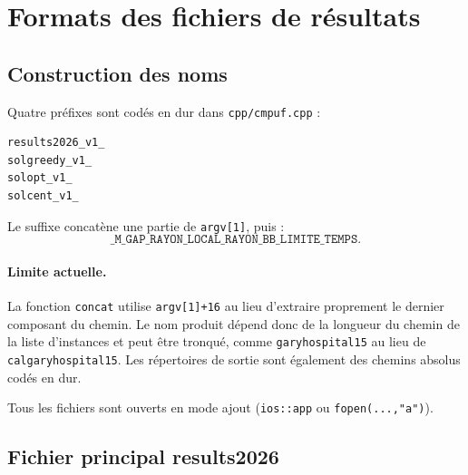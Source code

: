 \documentclass[11pt,a4paper]{article}
\newcommand{\code}[1]{\texttt{#1}}
\begin{document}
\section{Formats des fichiers de résultats}

\subsection{Construction des noms}

Quatre préfixes sont codés en dur dans \code{cpp/cmpuf.cpp} :
\begin{lstlisting}
results2026_v1_
solgreedy_v1_
solopt_v1_
solcent_v1_
\end{lstlisting}

Le suffixe concatène une partie de \code{argv[1]}, puis :
\[
\code{\_M\_GAP\_RAYON\_LOCAL\_RAYON\_BB\_LIMITE\_TEMPS}.
\]

\paragraph{Limite actuelle.}
La fonction \code{concat} utilise \code{argv[1]+16} au lieu d'extraire
proprement le dernier composant du chemin. Le nom produit dépend donc de la
longueur du chemin de la liste d'instances et peut être tronqué, comme
\code{garyhospital15} au lieu de \code{calgaryhospital15}. Les répertoires de
sortie sont également des chemins absolus codés en dur.

Tous les fichiers sont ouverts en mode ajout (\code{ios::app} ou
\code{fopen(...,"a")}).

\subsection{Fichier principal results2026}
\end{document}
